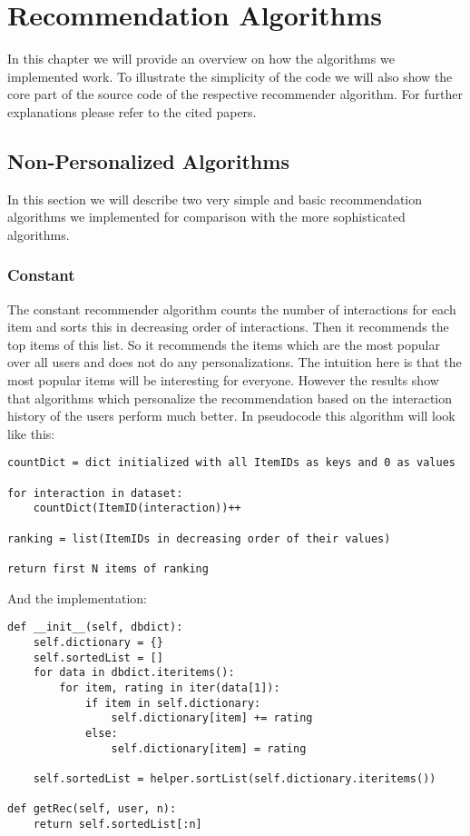 \chapter{Recommendation Algorithms}
\label{recommendationalgorithms}
In this chapter we will provide an overview on how the algorithms we implemented
work. To illustrate the simplicity of the code we will also show the core part of 
the source code of the respective recommender algorithm.
For further explanations please refer to the cited papers.


\section{Non-Personalized Algorithms}

In this section we will describe two very simple and basic recommendation
algorithms we implemented for comparison with the more sophisticated
algorithms.


\subsection{Constant}

The constant recommender algorithm counts the number of interactions
for each item and sorts this in decreasing order of interactions.
Then it recommends the top items of this list. So it recommends the
items which are the most popular over all users and does not do any
personalizations. The intuition here is that the most popular items
will be interesting for everyone. However the results show that
algorithms which personalize the recommendation based on the 
interaction history of the users perform much better.
In pseudocode this algorithm will look like this:
\begin{lstlisting}[style=pseudocode]
countDict = dict initialized with all ItemIDs as keys and 0 as values

for interaction in dataset:
    countDict(ItemID(interaction))++

ranking = list(ItemIDs in decreasing order of their values)

return first N items of ranking
\end{lstlisting}
And the implementation:
\begin{lstlisting}[style=python]
def __init__(self, dbdict):
    self.dictionary = {}
    self.sortedList = []
    for data in dbdict.iteritems():
        for item, rating in iter(data[1]):
            if item in self.dictionary:
                self.dictionary[item] += rating
            else:
                self.dictionary[item] = rating

    self.sortedList = helper.sortList(self.dictionary.iteritems())

def getRec(self, user, n):
    return self.sortedList[:n]
\end{lstlisting}



